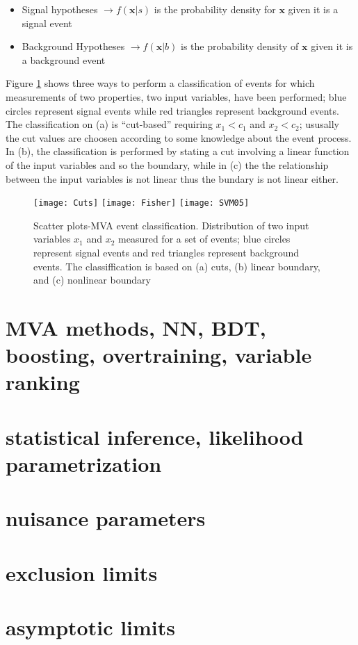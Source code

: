 \begin{itemize}
\item Signal hypotheses $\to f(\textbf{x}|s)$ is the probability density for $\textbf{x}$ given it is a signal event 
\item Background Hypotheses $ \to f(\textbf{x}|b)$ is the probability density of $\textbf{x}$ given it is a background event
\end{itemize}

Figure \ref{fig:scatter_plot} shows three ways to perform a classification of events for which measurements of two properties, two input variables, have been performed; blue circles represent signal events while red triangles represent background events. The classification on (a) is ``cut-based'' requiring $x_1<c_1$ and $x_2<c_2$; ususally the cut values are choosen according to some knowledge about the event process. In (b), the classification is performed by stating a cut involving a linear function of the input variables and so the boundary, while in (c) the the relationship between the input variables is not linear thus the bundary is not linear either.          

\begin{figure}[!h]
  \centering
  \texttt{[image: Cuts]}
  \texttt{[image: Fisher]}
  \texttt{[image: SVM05]}
  \caption[Scatter plots-MVA event classification.]{Scatter plots-MVA event classification. Distribution of two input variables $x_1$ and $x_2$ measured for a set of events; blue circles represent signal events and red triangles represent background events. The classiffication is based on (a) cuts, (b) linear boundary, and (c) nonlinear boundary\cite{mva}}\label{fig:scatter_plot}
\end{figure}







\section{ MVA methods, NN, BDT, boosting, overtraining, variable ranking  }
\section{statistical inference, likelihood parametrization}
\section{ nuisance parameters}
\section{exclusion limits }
\section{asymptotic limits }


 









